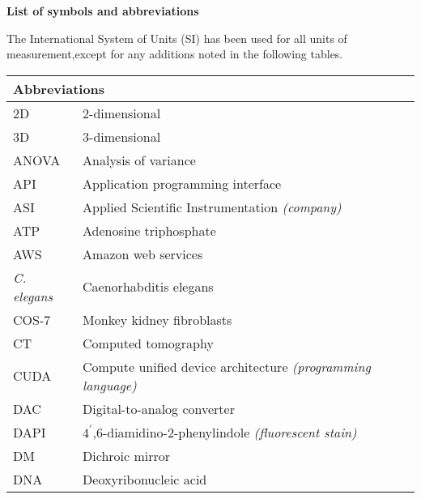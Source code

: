 
 \vspace*{3em} \thispagestyle{empty}
\begin {flushleft} 
	\huge \textbf{List of symbols and abbreviations} 
\end{flushleft} 
\vspace*{2em}

\begin{flushleft}
The International System of Units (SI) has been used for all units of measurement,\newline except for any additions noted in the following tables.

\begin{longtable}[l]{|p{5.5em}|p{25em}|}
\hline 
\multicolumn{2}{|l|}{\textbf{Abbreviations}} \\
\hline 
2D         & 2-dimensional                                              \\
3D         & 3-dimensional                                              \\
ANOVA      & Analysis of variance                                       \\
API        & Application programming interface                          \\
ASI        & Applied Scientific Instrumentation \textit{(company)}               \\
ATP        & Adenosine triphosphate                                     \\
AWS        & Amazon web services                                        \\
\textit{C. elegans} & Caenorhabditis elegans                                     \\
COS-7      & Monkey kidney fibroblasts                                  \\
CT         & Computed tomography                                        \\
CUDA       & Compute unified device architecture \textit{(programming language)} \\
DAC        & Digital-to-analog converter                                \\
DAPI       & $4^\prime$,6-diamidino-2-phenylindole \textit{(fluorescent stain)}          \\
DM         & Dichroic mirror                                            \\
DNA        & Deoxyribonucleic acid                                      \\

\end{longtable}
\end{flushleft}
